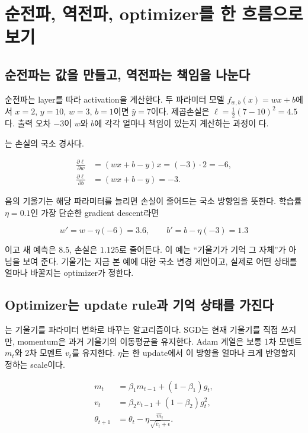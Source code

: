 \chapter{순전파, 역전파, optimizer를 한 흐름으로 보기}
\label{bg:chapter-forward-backward}

\section{순전파는 값을 만들고, 역전파는 책임을 나눈다}

순전파는 layer를 따라 activation을 계산한다. 두 파라미터 모델
$f_{w,b}(x)=wx+b$에서 $x=2$, $y=10$, $w=3$, $b=1$이면 $\hat y=7$이다.
제곱손실은 $\ell=\frac12(7-10)^2=4.5$다. 출력 오차 $-3$이 $w$와 $b$에
각각 얼마나 책임이 있는지 계산하는 과정이 다.

는 손실의 국소 경사다.

\begin{align}
  \frac{\partial \ell}{\partial w} &= (wx+b-y)x = (-3)\cdot2=-6,\\
  \frac{\partial \ell}{\partial b} &= (wx+b-y)=-3.
  \label{eq:bg-two-parameter-gradient}
\end{align}

음의 기울기는 해당 파라미터를 늘리면 손실이 줄어드는 국소 방향임을 뜻한다. 학습률
$\eta=0.1$인 가장 단순한 gradient descent라면

\begin{equation}
  w' = w-\eta(-6)=3.6,\qquad b'=b-\eta(-3)=1.3
\end{equation}

이고 새 예측은 $8.5$, 손실은 $1.125$로 줄어든다. 이 예는 ``기울기가 기억 그 자체''가
아님을 보여 준다. 기울기는 지금 본 예에 대한 국소 변경 제안이고, 실제로 어떤 상태를
얼마나 바꿀지는 optimizer가 정한다.

\section{Optimizer는 update rule과 기억 상태를 가진다}

는 기울기를 파라미터 변화로 바꾸는 알고리즘이다.
SGD는 현재 기울기를 직접 쓰지만, momentum은 과거 기울기의 이동평균을 유지한다.
Adam 계열은 보통 1차 모멘트 $m_t$와 2차 모멘트 $v_t$를 유지한다.
 $\eta$는 한 update에서 이 방향을 얼마나 크게 반영할지
정하는 scale이다.

\begin{align}
  m_t &= \beta_1m_{t-1}+(1-\beta_1)g_t,\\
  v_t &= \beta_2v_{t-1}+(1-\beta_2)g_t^2,\\
  \theta_{t+1} &= \theta_t-\eta
  \frac{\hat m_t}{\sqrt{\hat v_t}+\epsilon}.
  \label{eq:bg-adam}
\end{align}


